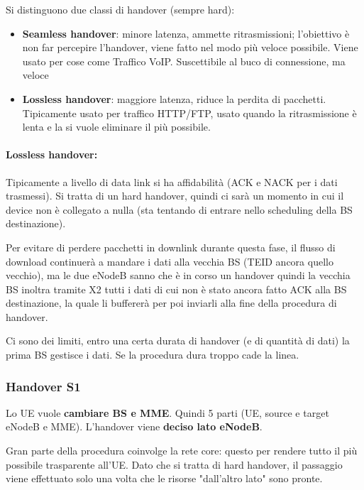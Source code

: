 Si distinguono due classi di handover (sempre hard):
\begin{itemize}
	\item \textbf{Seamless handover}: minore latenza, ammette ritrasmissioni; l'obiettivo è non far percepire l'handover, viene fatto nel modo più veloce possibile. Viene usato per cose come Traffico VoIP. Suscettibile al buco di connessione, ma veloce

	\item \textbf{Lossless handover}: maggiore latenza, riduce la perdita di pacchetti. Tipicamente usato per traffico HTTP/FTP, usato quando la ritrasmissione è lenta e la si vuole eliminare il più possibile.
\end{itemize}

\paragraph{Lossless handover:} Tipicamente a livello di data link si ha affidabilità (ACK e NACK per i dati trasmessi). Si tratta di un hard handover, quindi ci sarà un momento in cui il device non è collegato a nulla (sta tentando di entrare nello scheduling della BS destinazione). 

Per evitare di perdere pacchetti in downlink durante questa fase, il flusso di download continuerà a mandare i dati alla vecchia BS (TEID ancora quello vecchio), ma le due eNodeB sanno che è in corso un handover quindi la vecchia BS inoltra tramite X2 tutti i dati di cui non è stato ancora fatto ACK alla BS destinazione, la quale li buffererà per poi inviarli alla fine della procedura di handover. 

Ci sono dei limiti, entro una certa durata di handover (e di quantità di dati) la prima BS gestisce i dati. Se la procedura dura troppo cade la linea.

\subsubsection{Handover S1}

Lo UE vuole \textbf{cambiare BS e MME}. Quindi 5 parti (UE, source e target eNodeB e MME). L'handover viene \textbf{deciso lato eNodeB}. 

Gran parte della procedura coinvolge la rete core: questo per rendere tutto il più possibile trasparente all'UE. Dato che si tratta di hard handover, il passaggio viene effettuato solo una volta che le risorse "dall'altro lato" sono pronte. 

